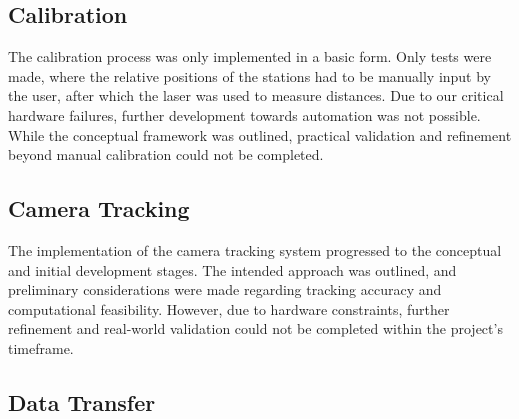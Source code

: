 
\subsection{Calibration}

The calibration process was only implemented in a basic form. Only tests were made, where the relative positions of the stations had to be manually input by the user, after which the laser was used to measure distances. Due to our critical hardware failures, further development towards automation was not possible. While the conceptual framework was outlined, practical validation and refinement beyond manual calibration could not be completed.

\subsection{Camera Tracking}

The implementation of the camera tracking system progressed to the conceptual and initial development stages. The intended approach was outlined, and preliminary considerations were made regarding tracking accuracy and computational feasibility. However, due to hardware constraints, further refinement and real-world validation could not be completed within the project's timeframe.

\newpage

\subsection{Data Transfer}\label{subsec:DataTransfer}

